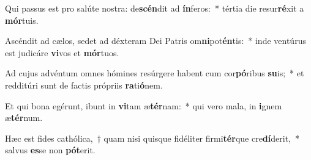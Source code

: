 \item Qui passus est pro salúte nostra: de\textbf{scén}dit ad \textbf{ín}feros:~* tértia die resur\textbf{ré}xit a \textbf{mór}tuis.
\item Ascéndit ad cælos, sedet ad déxteram Dei Patris om\textbf{ni}pot\textbf{én}tis:~* inde ventúrus est judicáre \textbf{vi}vos et \textbf{mór}tuos.
\item Ad cujus advéntum omnes hómines resúrgere habent cum cor\textbf{pó}ribus \textbf{su}is;~* et redditúri sunt de factis própriis \textbf{ra}ti\textbf{ó}nem.
\item Et qui bona egérunt, ibunt in \textbf{vi}tam æ\textbf{tér}nam:~* qui vero mala, in \textbf{i}gnem æ\textbf{tér}num.
\item Hæc est fides cathólica,~† quam nisi quisque fidéliter firmi\textbf{tér}que cre\textbf{dí}derit,~* salvus \textbf{es}se non \textbf{pót}erit.
